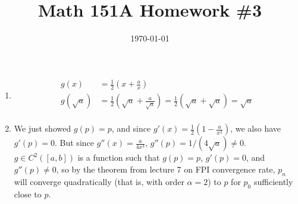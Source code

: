 \documentclass{article}
\date{\today}
\title{Math 151A Homework \#3}
\begin{document}
\maketitle

\bigskip
\begin{prob}
\end{prob}
\begin{enumerate}[label=(\alph*)]
    \item \begin{align*}
            g(x) &= \frac{1}{2} \left( x + \frac{a}{x} \right) \\
            g( \sqrt{a}) &= \frac{1}{2} \left( \sqrt{a} + \frac{a}{\sqrt{a}} \right) = \frac{1}{2} \left( \sqrt{a} + \sqrt{a} \right) = \sqrt{a} \\
    \end{align*}
\item We just showed $g(p)=p$, and since $g'(x) = \frac{1}{2} \left( 1 - \frac{a}{x^2} \right)$, we also have $g'(p)=0$. But since $g''(x) = \frac{a}{4x^3}$, $g''(p) = 1/(4 \sqrt{a}) \neq 0$. $g \in C^2([a,b])$ is a function such that $g(p)=p$, $g'(p)=0$, and $g''(p) \neq 0$, so by the theorem from lecture 7 on FPI convergence rate, $p_n$ will converge quadratically (that is, with order $\alpha=2$) to $p$ for $p_0$ sufficiently close to $p$.
\end{enumerate}
\end{document}

